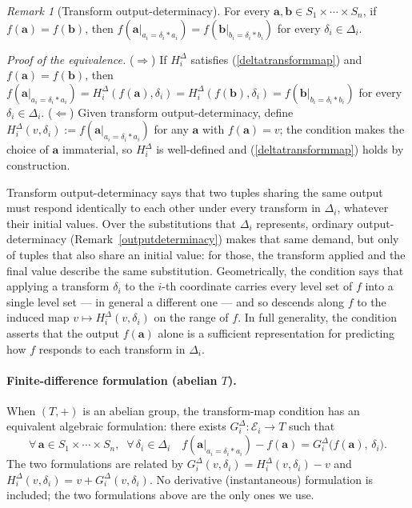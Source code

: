 \documentclass{article}
\theoremstyle{definition}
\theoremstyle{remark}
\newtheorem{remark}[proposition]{Remark}
\begin{document}
\begin{remark}[Transform output-determinacy]
\label{transformoutputdeterminacy}
For every $\boldsymbol{a}, \boldsymbol{b} \in S_1 \times \cdots \times S_n$, if $f(\boldsymbol{a}) = f(\boldsymbol{b})$, then $f(\boldsymbol{a}|_{a_i = \delta_i \ast a_i}) = f(\boldsymbol{b}|_{b_i = \delta_i \ast b_i})$ for every $\delta_i \in \Delta_i$.
\end{remark}

\noindent \textit{Proof of the equivalence.} ($\Rightarrow$) If $H_i^\Delta$ satisfies (\ref{deltatransformmap}) and $f(\boldsymbol{a}) = f(\boldsymbol{b})$, then $f(\boldsymbol{a}|_{a_i = \delta_i \ast a_i}) = H_i^\Delta(f(\boldsymbol{a}), \delta_i) = H_i^\Delta(f(\boldsymbol{b}), \delta_i) = f(\boldsymbol{b}|_{b_i = \delta_i \ast b_i})$ for every $\delta_i \in \Delta_i$. ($\Leftarrow$) Given transform output-determinacy, define $H_i^\Delta(v, \delta_i) := f(\boldsymbol{a}|_{a_i = \delta_i \ast a_i})$ for any $\boldsymbol{a}$ with $f(\boldsymbol{a}) = v$; the condition makes the choice of $\boldsymbol{a}$ immaterial, so $H_i^\Delta$ is well-defined and (\ref{deltatransformmap}) holds by construction.

\noindent Transform output-determinacy says that two tuples sharing the same output must respond identically to each other under every transform in $\Delta_i$, whatever their initial values. Over the substitutions that $\Delta_i$ represents, ordinary output-determinacy (Remark~\ref{outputdeterminacy}) makes that same demand, but only of tuples that also share an initial value: for those, the transform applied and the final value describe the same substitution. Geometrically, the condition says that applying a transform $\delta_i$ to the $i$-th coordinate carries every level set of $f$ into a single level set --- in general a different one --- and so descends along $f$ to the induced map $v \mapsto H_i^\Delta(v, \delta_i)$ on the range of $f$. In full generality, the condition asserts that the output $f(\boldsymbol{a})$ alone is a sufficient representation for predicting how $f$ responds to each transform in $\Delta_i$.

\paragraph{Finite-difference formulation (abelian $T$).} When $(T, +)$ is an abelian group, the transform-map condition has an equivalent algebraic formulation: there exists $G_i^\Delta \colon \mathcal{E}_i \to T$ such that
\begin{equation}
\label{transformfinitedifference}
\forall\, \boldsymbol{a} \in S_1 \times \cdots \times S_n,\;\; \forall\, \delta_i \in \Delta_i \quad
f(\boldsymbol{a}|_{a_i = \delta_i \ast a_i}) - f(\boldsymbol{a}) = G_i^\Delta\bigl(f(\boldsymbol{a}),\, \delta_i\bigr).
\end{equation}
The two formulations are related by $G_i^\Delta(v, \delta_i) = H_i^\Delta(v, \delta_i) - v$ and $H_i^\Delta(v, \delta_i) = v + G_i^\Delta(v, \delta_i)$. No derivative (instantaneous) formulation is included; the two formulations above are the only ones we use.
\end{document}
